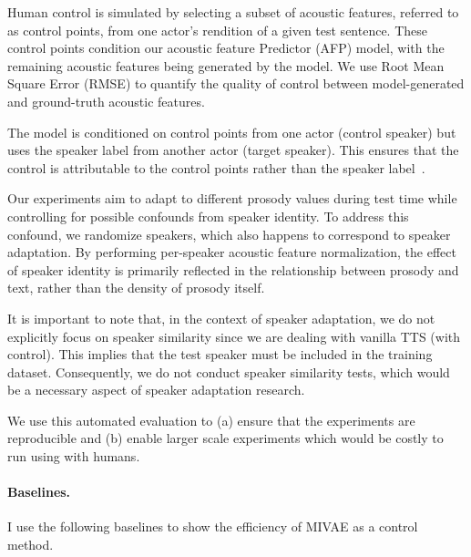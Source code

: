 \documentclass[../thesis.tex]{subfiles}
\begin{document}
Human  control is simulated by selecting a subset of acoustic features, referred to as control points, from one actor's rendition of a given test sentence.  These control points condition our acoustic feature Predictor (AFP) model, with the remaining acoustic features being generated by the model. We use Root Mean Square Error (RMSE) to quantify the quality of control between model-generated and ground-truth acoustic features. 

The model is conditioned on control points from one actor (control speaker) but uses the speaker label  from another actor (target speaker). This ensures that the control is attributable to the control points rather than the speaker label~\citep{siniIntroducingProsodicSpeaker2020}.

Our experiments aim to adapt to different prosody values during test time while controlling for possible confounds from speaker identity. To address this confound, we randomize speakers, which also happens to correspond to speaker adaptation.  By performing per-speaker acoustic feature normalization, the effect of speaker identity is primarily reflected in the relationship between prosody and text, rather than the density of prosody itself. 

It is important to note that, in the context of speaker adaptation, we do not explicitly focus on speaker similarity since we are dealing with vanilla TTS (with control). This implies that the test speaker must be included in the training dataset. Consequently, we do not conduct speaker similarity tests, which would be a necessary aspect of speaker adaptation research.

We use this automated evaluation to (a) ensure that the experiments are reproducible and (b) enable larger scale experiments which would be costly to run using with humans.

\paragraph{Baselines.} I use the following baselines to show the efficiency of MIVAE as a control method.
\end{document}

